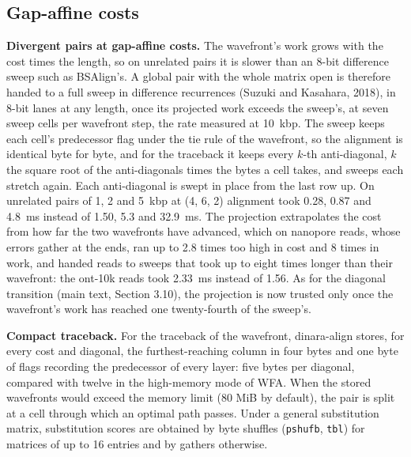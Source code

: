 \documentclass[10pt]{article}
\begin{document}
\subsection{Gap-affine costs}

\textbf{Divergent pairs at gap-affine costs.} The wavefront's work grows with the cost times the length, so on unrelated pairs it is slower than an 8-bit difference sweep such as BSAlign's. A global pair with the whole matrix open is therefore handed to a full sweep in difference recurrences (Suzuki and Kasahara, 2018), in 8-bit lanes at any length, once its projected work exceeds the sweep's, at seven sweep cells per wavefront step, the rate measured at 10~kbp. The sweep keeps each cell's predecessor flag under the tie rule of the wavefront, so the alignment is identical byte for byte, and for the traceback it keeps every \(k\)-th anti-diagonal, \(k\) the square root of the anti-diagonals times the bytes a cell takes, and sweeps each stretch again. Each anti-diagonal is swept in place from the last row up. On unrelated pairs of 1, 2 and 5~kbp at (4, 6, 2) alignment took 0.28, 0.87 and 4.8~ms instead of 1.50, 5.3 and 32.9~ms. The projection extrapolates the cost from how far the two wavefronts have advanced, which on nanopore reads, whose errors gather at the ends, ran up to 2.8 times too high in cost and 8 times in work, and handed reads to sweeps that took up to eight times longer than their wavefront: the ont-10k reads took 2.33~ms instead of 1.56. As for the diagonal transition (main text, Section 3.10), the projection is now trusted only once the wavefront's work has reached one twenty-fourth of the sweep's.

\textbf{Compact traceback.} For the traceback of the wavefront, dinara-align stores, for every cost and diagonal, the furthest-reaching column in four bytes and one byte of flags recording the predecessor of every layer: five bytes per diagonal, compared with twelve in the high-memory mode of WFA. When the stored wavefronts would exceed the memory limit (80 MiB by default), the pair is split at a cell through which an optimal path passes. Under a general substitution matrix, substitution scores are obtained by byte shuffles (\texttt{pshufb}, \texttt{tbl}) for matrices of up to 16 entries and by gathers otherwise.
\end{document}
